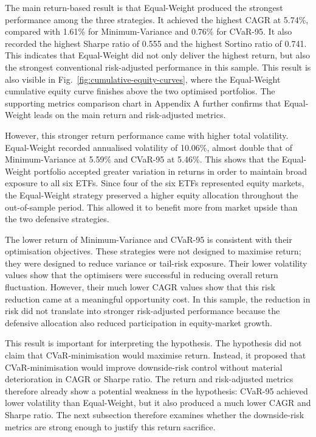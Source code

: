 \par The main return-based result is that Equal-Weight produced the strongest performance among the three strategies. It achieved the highest CAGR at 5.74\%, compared with 1.61\% for Minimum-Variance and 0.76\% for CVaR-95. It also recorded the highest Sharpe ratio of 0.555 and the highest Sortino ratio of 0.741. This indicates that Equal-Weight did not only deliver the highest return, but also the strongest conventional risk-adjusted performance in this sample. This result is also visible in Fig.~\ref{fig:cumulative-equity-curves}, where the Equal-Weight cumulative equity curve finishes above the two optimised portfolios. The supporting metrics comparison chart in Appendix A further confirms that Equal-Weight leads on the main return and risk-adjusted metrics.
\par However, this stronger return performance came with higher total volatility. Equal-Weight recorded annualised volatility of 10.06\%, almost double that of Minimum-Variance at 5.59\% and CVaR-95 at 5.46\%. This shows that the Equal-Weight portfolio accepted greater variation in returns in order to maintain broad exposure to all six ETFs. Since four of the six ETFs represented equity markets, the Equal-Weight strategy preserved a higher equity allocation throughout the out-of-sample period. This allowed it to benefit more from market upside than the two defensive strategies.
\par The lower return of Minimum-Variance and CVaR-95 is consistent with their optimisation objectives. These strategies were not designed to maximise return; they were designed to reduce variance or tail-risk exposure. Their lower volatility values show that the optimisers were successful in reducing overall return fluctuation. However, their much lower CAGR values show that this risk reduction came at a meaningful opportunity cost. In this sample, the reduction in risk did not translate into stronger risk-adjusted performance because the defensive allocation also reduced participation in equity-market growth.
\par This result is important for interpreting the hypothesis. The hypothesis did not claim that CVaR-minimisation would maximise return. Instead, it proposed that CVaR-minimisation would improve downside-risk control without material deterioration in CAGR or Sharpe ratio. The return and risk-adjusted metrics therefore already show a potential weakness in the hypothesis: CVaR-95 achieved lower volatility than Equal-Weight, but it also produced a much lower CAGR and Sharpe ratio. The next subsection therefore examines whether the downside-risk metrics are strong enough to justify this return sacrifice.

